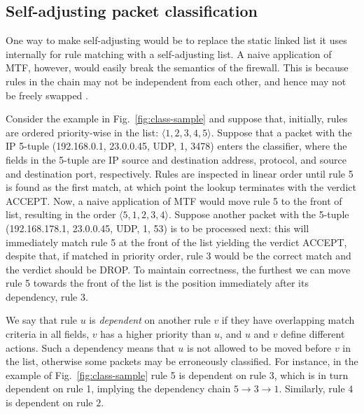 \subsection{Self-adjusting packet classification}
\label{sec:sa-sa-pack-class}

One way to make \nftables self-adjusting would be to replace the static linked list it uses internally for rule matching with a self-adjusting list. A naive application of MTF, however, would easily break the semantics of the firewall. This is because rules in the chain may not be independent from each other, and hence may not be freely swapped \cite{10.1145/2619239.2626294}.

Consider the example in Fig.~\ref{fig:class-sample} and suppose that, initially, rules are ordered priority-wise in the list: $\langle1, 2, 3, 4, 5\rangle$. Suppose that a packet with the IP 5-tuple (192.168.0.1, 23.0.0.45, UDP, 1, 3478) enters the classifier, where the fields in the 5-tuple are IP source and destination address, protocol, and source and destination port, respectively. Rules are inspected in linear order until rule 5 is found as the first match, at which point the lookup terminates with the verdict ACCEPT. Now, a naive application of MTF would move rule 5 to the front of list, resulting in the order $\langle5, 1, 2, 3, 4\rangle$. Suppose another packet with the 5-tuple (192.168.178.1, 23.0.0.45, UDP, 1, 53) is to be processed next: this will immediately match rule 5 at the front of the list yielding the verdict ACCEPT, despite that, if matched in priority order, rule 3 would be the correct match and the verdict should be DROP. To maintain correctness, the furthest we can move rule 5 towards the front of the list is the position immediately after its dependency, rule 3.

We say that rule $u$ is \emph{dependent} on another rule $v$ if they have overlapping match criteria in all fields, $v$ has a higher priority than $u$, and $u$ and $v$ define different actions. Such a dependency means that $u$ is not allowed to be moved before $v$ in the list, otherwise some packets may be erroneously classified. For instance, in the example of Fig.~\ref{fig:class-sample} rule 5 is dependent on rule 3, which is in turn dependent on rule 1, implying the dependency chain $5\to 3\to 1$. Similarly, rule $4$ is dependent on rule $2$. %

